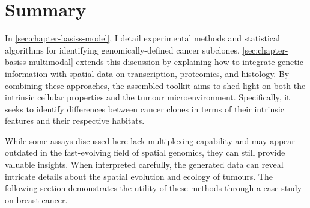 \section{Summary}
\label{sec:modalities-summary}

In \cref{sec:chapter-basiss-model}, I detail experimental methods and statistical algorithms for identifying genomically-defined cancer subclones. \cref{sec:chapter-basiss-multimodal} extends this discussion by explaining how to integrate genetic information with spatial data on transcription, proteomics, and histology. By combining these approaches, the assembled toolkit aims to shed light on both the intrinsic cellular properties and the tumour microenvironment. Specifically, it seeks to identify differences between cancer clones in terms of their intrinsic features and their respective habitats.

While some assays discussed here lack multiplexing capability and may appear outdated in the fast-evolving field of spatial genomics, they can still provide valuable insights. When interpreted carefully, the generated data can reveal intricate details about the spatial evolution and ecology of tumours. The following section  demonstrates the utility of these methods through a case study on breast cancer.